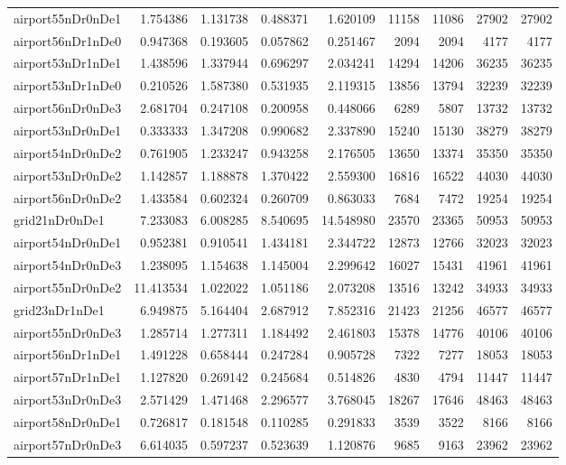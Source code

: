 \begin{longtable}{|l|r|r|r|r|r|r|r|r|}
airport55nDr0nDe1 & 1.754386 & 1.131738 & 0.488371 & 1.620109 & 11158 & 11086 & 27902 & 27902 \\
airport56nDr1nDe0 & 0.947368 & 0.193605 & 0.057862 & 0.251467 & 2094 & 2094 & 4177 & 4177 \\
airport53nDr1nDe1 & 1.438596 & 1.337944 & 0.696297 & 2.034241 & 14294 & 14206 & 36235 & 36235 \\
airport53nDr1nDe0 & 0.210526 & 1.587380 & 0.531935 & 2.119315 & 13856 & 13794 & 32239 & 32239 \\
airport56nDr0nDe3 & 2.681704 & 0.247108 & 0.200958 & 0.448066 & 6289 & 5807 & 13732 & 13732 \\
airport53nDr0nDe1 & 0.333333 & 1.347208 & 0.990682 & 2.337890 & 15240 & 15130 & 38279 & 38279 \\
airport54nDr0nDe2 & 0.761905 & 1.233247 & 0.943258 & 2.176505 & 13650 & 13374 & 35350 & 35350 \\
airport53nDr0nDe2 & 1.142857 & 1.188878 & 1.370422 & 2.559300 & 16816 & 16522 & 44030 & 44030 \\
airport56nDr0nDe2 & 1.433584 & 0.602324 & 0.260709 & 0.863033 & 7684 & 7472 & 19254 & 19254 \\
grid21nDr0nDe1 & 7.233083 & 6.008285 & 8.540695 & 14.548980 & 23570 & 23365 & 50953 & 50953 \\
airport54nDr0nDe1 & 0.952381 & 0.910541 & 1.434181 & 2.344722 & 12873 & 12766 & 32023 & 32023 \\
airport54nDr0nDe3 & 1.238095 & 1.154638 & 1.145004 & 2.299642 & 16027 & 15431 & 41961 & 41961 \\
airport55nDr0nDe2 & 11.413534 & 1.022022 & 1.051186 & 2.073208 & 13516 & 13242 & 34933 & 34933 \\
grid23nDr1nDe1 & 6.949875 & 5.164404 & 2.687912 & 7.852316 & 21423 & 21256 & 46577 & 46577 \\
airport55nDr0nDe3 & 1.285714 & 1.277311 & 1.184492 & 2.461803 & 15378 & 14776 & 40106 & 40106 \\
airport56nDr1nDe1 & 1.491228 & 0.658444 & 0.247284 & 0.905728 & 7322 & 7277 & 18053 & 18053 \\
airport57nDr1nDe1 & 1.127820 & 0.269142 & 0.245684 & 0.514826 & 4830 & 4794 & 11447 & 11447 \\
airport53nDr0nDe3 & 2.571429 & 1.471468 & 2.296577 & 3.768045 & 18267 & 17646 & 48463 & 48463 \\
airport58nDr0nDe1 & 0.726817 & 0.181548 & 0.110285 & 0.291833 & 3539 & 3522 & 8166 & 8166 \\
airport57nDr0nDe3 & 6.614035 & 0.597237 & 0.523639 & 1.120876 & 9685 & 9163 & 23962 & 23962 \\

\end{longtable}
